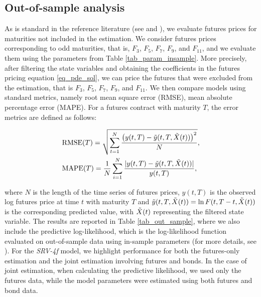 \documentclass{article}
\begin{document}

\newpage

\subsection{Out-of-sample analysis}

As is standard in the reference literature (see \cite{schwartz97} and \cite{spinler17}), we evaluate futures prices for maturities not included in the estimation. We consider futures prices corresponding to odd maturities, that is, \(F_3\), \(F_5\), \(F_7\), \(F_9\), and \(F_{11}\), and we evaluate them using the parameters from Table \ref{tab_param_insample}.
More precisely, after filtering the state variables and obtaining the coefficients in the futures pricing equation \eqref{eq_pde_sol}, we can price the futures that were excluded from the estimation, that is \(F_3\), \(F_5\), \(F_7\), \(F_9\), and \(F_{11}\). We then compare models using standard metrics, namely root mean square error (RMSE), mean absolute percentage error (MAPE). For a futures contract with maturity $T$, the error metrics are defined as follows:

\begin{align*}
    &\text{RMSE}(T) = \sqrt{ \sum_{t=1}^N \frac{ \left( y(t,T) - \Tilde{y}(t,T,\Tilde{X}(t)) \right)^2 }{N}}, \\
    &\text{MAPE}(T) = \frac{1}{N}\sum_{i=1}^N
    \frac{ |y(t,T) - \Tilde{y}(t,T,\Tilde{X}(t))|}{y(t,T)}, 
\end{align*}

\noindent where $N$ is the length of the time series of futures prices, $y(t,T)$ is the observed log futures price at time $t$ with maturity $T$ and $\Tilde{y}(t,T,\Tilde{X}(t))=\ln{F(t,T-t,\Tilde{X}(t))}$ is the corresponding predicted value, with $\Tilde{X}(t)$ representing the filtered state variable. The results are reported in Table \ref{tab_out_sample}, where we also include the predictive log-likelihood, which is the log-likelihood function evaluated on out-of-sample data using in-sample parameters (for more details, see \cite{gonzales04}). For the \textit{SRV-4f} model, we highlight performance for both the futures-only estimation and the joint estimation involving futures and bonds. In the case of joint estimation, when calculating the predictive likelihood, we used only the futures data, while the model parameters were estimated using both futures and bond data.
\end{document}
